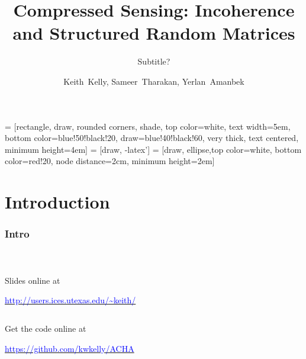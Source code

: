 \documentclass[mathserif,18pt,xcolor=table]{beamer}
\title{Compressed Sensing: Incoherence and Structured Random Matrices}
\subtitle{Subtitle?}
\author[Keith Kelly, Sameer~Tharakan, Yerlan~Amanbek]{ {Keith~Kelly, Sameer~Tharakan, Yerlan~Amanbek} \\  
}
\institute{Institute for Computational Engineering \& Sciences\\ \mbox{}  \\  \pgfuseimage{utbig} }
\date[ACHA]
\begin{document}
 = [rectangle, draw, rounded corners, shade, top color=white, text width=5em,
  bottom color=blue!50!black!20, draw=blue!40!black!60, very thick, text centered, minimum height=4em]
   = [draw, -latex']
   = [draw, ellipse,top color=white, bottom color=red!20, node distance=2cm, minimum height=2em]


  \beamertemplateballitem

  \frame{\titlepage}



\section{Introduction}

\begin{frame}[t]
\frametitle{Intro}
\framesubtitle{~~}  %

Slides online at

\href{http://users.ices.utexas.edu/~keith/}{\textcolor{blue}{http://users.ices.utexas.edu/\textasciitilde keith/}}

$$
$$

Get the code online at

\href{https://github.com/kwkelly/ACHA}{\textcolor{blue}{https://github.com/kwkelly/ACHA}}


\end{frame}


\end{document}
